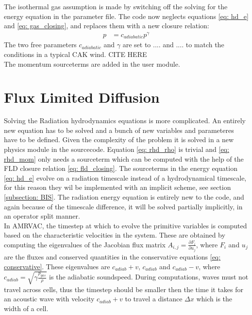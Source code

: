 The isothermal gas assumption is made by switching off the solving for the energy equation in the parameter file. The code now neglects equations \eqref{eq: hd_e} and \eqref{eq: gas_closing}, and replaces them with a new closure relation:
\begin{align}
 p &= c_{adiabatic} p^\gamma
\end{align}
The two free parameters $c_{adiabatic}$ and $\gamma$ are set to .... and .... to match the conditions in a typical CAK wind. CITE HERE\\

The momentum sourceterms are added in the user module.


\section{Flux Limited Diffusion}
Solving the Radiation hydrodynamics equations is more complicated. An entirely new equation has to be solved and a bunch of new variables and parameteres have to be defined. Given the complexity of the problem it is solved in a new physics module in the sourcecode. Equation \eqref{eq: rhd_rho} is trivial and \eqref{eq: rhd_mom} only needs a sourceterm which can be computed with the help of the FLD closure relation \eqref{eq: fld_closing}. The sourceterms in the energy equation \eqref{eq: hd_e} evolve on a radiation timescale instead of a hydrodynamical timescale, for this reason they wil be implemented with an implicit scheme, see section \ref{subsection: BIS}. The radiation energy equation is entirely new to the code, and again because of the timescale difference, it will be solved partially implicitly, in an operator split manner. \\

In AMRVAC, the timestep at which to evolve the primitive variables is computed based on the characteristic velocities in the system. These are obtained by computing the eigenvalues of the Jacobian flux matrix $A_{i,j} = \frac{\partial F_i}{\partial u_j}$, where $F_i$ and $u_j$ are the fluxes and conserved quantities in the conservative equations \eqref{eq: conservative}. These eigenvalues are $c_{adiab} + v$, $c_{adiab}$ and $c_{adiab} - v$, where $c_{adiab} = \sqrt{\gamma\frac{p_{gas}}{\rho}}$ is the adiabatic soundspeed. During computations, waves must not travel across cells, thus the timestep should be smaller then the time it takes for an acoustic wave with velocity $c_{adiab} + v$ to travel a distance $\Delta x$ which is the width of a cell.\\


